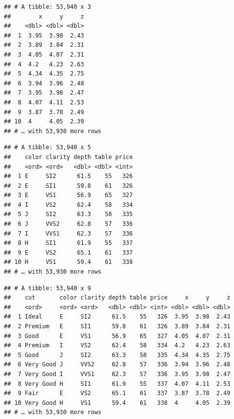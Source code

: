 \documentclass[
]{book}
\newenvironment{Shaded}{\begin{snugshade}}{\end{snugshade}}
\newcommand{\DecValTok}[1]{\textcolor[rgb]{0.00,0.00,0.81}{#1}}
\newcommand{\KeywordTok}[1]{\textcolor[rgb]{0.13,0.29,0.53}{\textbf{#1}}}
\newcommand{\NormalTok}[1]{#1}
\newcommand{\OperatorTok}[1]{\textcolor[rgb]{0.81,0.36,0.00}{\textbf{#1}}}
\newcommand{\StringTok}[1]{\textcolor[rgb]{0.31,0.60,0.02}{#1}}
\begin{document}
\begin{Shaded}
\end{Shaded}

\begin{verbatim}
## # A tibble: 53,940 x 3
##        x     y     z
##    <dbl> <dbl> <dbl>
##  1  3.95  3.98  2.43
##  2  3.89  3.84  2.31
##  3  4.05  4.07  2.31
##  4  4.2   4.23  2.63
##  5  4.34  4.35  2.75
##  6  3.94  3.96  2.48
##  7  3.95  3.98  2.47
##  8  4.07  4.11  2.53
##  9  3.87  3.78  2.49
## 10  4     4.05  2.39
## # … with 53,930 more rows
\end{verbatim}

\begin{Shaded}
\end{Shaded}

\begin{verbatim}
## # A tibble: 53,940 x 5
##    color clarity depth table price
##    <ord> <ord>   <dbl> <dbl> <int>
##  1 E     SI2      61.5    55   326
##  2 E     SI1      59.8    61   326
##  3 E     VS1      56.9    65   327
##  4 I     VS2      62.4    58   334
##  5 J     SI2      63.3    58   335
##  6 J     VVS2     62.8    57   336
##  7 I     VVS1     62.3    57   336
##  8 H     SI1      61.9    55   337
##  9 E     VS2      65.1    61   337
## 10 H     VS1      59.4    61   338
## # … with 53,930 more rows
\end{verbatim}

\begin{Shaded}
\end{Shaded}

\begin{verbatim}
## # A tibble: 53,940 x 9
##    cut       color clarity depth table price     x     y     z
##    <ord>     <ord> <ord>   <dbl> <dbl> <int> <dbl> <dbl> <dbl>
##  1 Ideal     E     SI2      61.5    55   326  3.95  3.98  2.43
##  2 Premium   E     SI1      59.8    61   326  3.89  3.84  2.31
##  3 Good      E     VS1      56.9    65   327  4.05  4.07  2.31
##  4 Premium   I     VS2      62.4    58   334  4.2   4.23  2.63
##  5 Good      J     SI2      63.3    58   335  4.34  4.35  2.75
##  6 Very Good J     VVS2     62.8    57   336  3.94  3.96  2.48
##  7 Very Good I     VVS1     62.3    57   336  3.95  3.98  2.47
##  8 Very Good H     SI1      61.9    55   337  4.07  4.11  2.53
##  9 Fair      E     VS2      65.1    61   337  3.87  3.78  2.49
## 10 Very Good H     VS1      59.4    61   338  4     4.05  2.39
## # … with 53,930 more rows
\end{verbatim}
\end{document}
